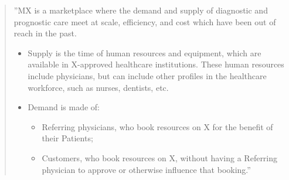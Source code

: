 \documentclass[graybox,envcountchap,sectrefs]{svmono}
\begin{document}
\begin{quote}
''MX is a marketplace where the demand and supply of diagnostic and prognostic care meet at scale, efficiency, and cost which have been out of reach in the past.
\begin{itemize}
	\item Supply is the time of human resources and equipment, which are available in X-approved healthcare institutions. These human resources include physicians, but can include other profiles in the healthcare workforce, such as nurses, dentists, etc. 
	\item Demand is made of:
	\begin{itemize}
		\item Referring physicians, who book resources on X for the benefit of their Patients;
		\item Customers, who book resources on X, without having a Referring physician to approve or otherwise influence that booking.''
	\end{itemize}
\end{itemize}
\end{quote}
\end{document}
